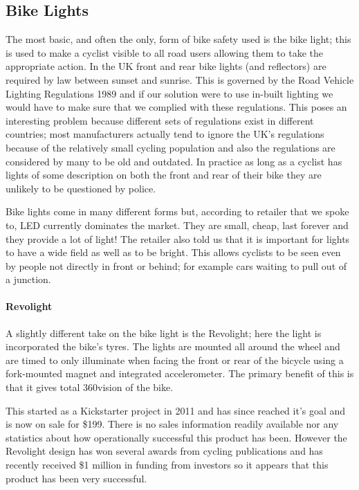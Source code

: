 \documentclass[a4paper]{report}
\begin{document}
\subsection{Bike Lights}
The most basic, and often the only, form of bike safety used is the bike light; this is used to make a cyclist visible to all road users allowing them to take the appropriate action. In the UK front and rear bike lights (and reflectors) are required by law between sunset and sunrise. This is governed by the Road Vehicle Lighting Regulations 1989\cite{rvlr} and if our solution were to use in-built lighting we would have to make sure that we complied with these regulations. This poses an interesting problem because different sets of regulations exist in different countries; most manufacturers actually tend to ignore the UK's regulations because of the relatively small cycling population and also the regulations are considered by many to be old and outdated. In practice as long as a cyclist has lights of some description on both the front and rear of their bike they are unlikely to be questioned by police. 

Bike lights come in many different forms but, according to retailer that we spoke to, LED currently dominates the market. They are small, cheap, last forever and they provide a lot of light! The retailer also told us that it is important for lights to have a wide field as well as to be bright. This allows cyclists to be seen even by people not directly in front or behind; for example cars waiting to pull out of a junction.

\paragraph{Revolight} A slightly different take on the bike light is the Revolight\cite{revolight}; here the light is incorporated the bike's tyres. The lights are mounted all around the wheel and are timed to only illuminate when facing the front or rear of the bicycle using a fork-mounted magnet and integrated accelerometer. The primary benefit of this is that it gives total 360\degree vision of the bike.

This started as a Kickstarter project\cite{revo_ks} in 2011 and has since reached it's goal and is now on sale for \$199. There is no sales information readily available nor any statistics about how operationally successful this product has been. However the Revolight design has won several awards from cycling publications\cite{revo_awards} and has recently received \$1 million in funding from investors so it appears that this product has been very successful.
\end{document}
